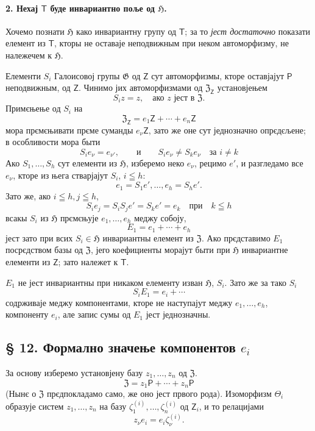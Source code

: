 \documentclass[11pt]{article}
\begin{document}
\paragraph{2. Нехај \(\mathsf T\) буде инвариантно поље од \(\mathfrak H\).}
Хочемо познати \(\mathfrak H\) како инвариантну групу од \(\mathsf T\); за то \emph{јест достаточно} показати елемент из \(\mathsf T\), кторы не оставаје неподвижным при неком автоморфизму, не належечем к \(\mathfrak H\).

Елементи \(S_i\) Галоисовој групы \(\mathfrak G\) од \(\mathsf Z\) сут автоморфизмы, кторе оставјајут \(\mathsf P\) неподвижным, од \(\mathsf Z\). Чинимо јих автоморфизмами од \(\mathfrak Z_{\mathsf Z}\) установјењем
\[
S_i z=z,\quad \text{ако } z \text{ јест в } \mathfrak Z.
\]
Примєњење од \(S_i\) на
\[
\mathfrak Z_{\mathsf Z}=e_1\mathsf Z+\cdots+e_n\mathsf Z
\]
мора прємєњивати прєме суманды \(e_\nu\mathsf Z\), зато же оне сут једнозначно опрєдєљене; в особливости мора быти
\[
S_i e_\nu=e_{\nu'},\qquad\text{и}\qquad S_i e_\nu\ne S_k e_\nu
\quad\text{за } i\ne k
\]
Ако \(S_1,\ldots,S_h\) сут елементи из \(\mathfrak H\), изберемо неко \(e_\nu\), рецимо \(e'\), и разгледамо все \(e_\nu\), кторе из њега стварјајут \(S_i\), \(i\leqq h\):
\[
e_1=S_1e',\ldots,e_h=S_he'.
\]
Зато же, ако \(i\leqq h, j\leqq h\),
\[
S_i e_j=S_iS_j e'=S_ke'=e_k \quad \text{при}\quad k\leqq h
\]
всакы \(S_i\) из \(\mathfrak H\) прємєњује \(e_1,\ldots,e_h\) меджу собоју,
\[
E_1=e_1+\cdots+e_h
\]
јест зато при всих \(S_i\in\mathfrak H\) инвариантны елемент из \(\mathfrak Z\). Ако прєдставимо \(E_1\) посрєдством базы од \(\mathfrak Z\), јего коефициенты морајут быти при \(\mathfrak H\) инвариантне елементи из \(\mathsf Z\); зато належет к \(\mathsf T\).

\(E_1\) не јест инвариантны при никаком елементу изван \(\mathfrak H\), \(S_i\). Зато же за тако \(S_i\)
\[
S_i E_1=e_i+\cdots
\]
содрживаје меджу компонентами, кторе не наступајут меджу \(e_1,\ldots,e_h\), компоненту \(e_i\), але запис сумы од \(E_1\) јест једнозначны.

\subsection*{§ 12. Формално значење компонентов \(e_i\)}\label{die-formale-bedeutung-der-komponenten-ei}

За основу изберемо установјену базу \(z_1,\ldots,z_n\) од \(\mathfrak Z\).
\[
\mathfrak Z=z_1\mathsf P+\cdots+z_n\mathsf P
\]
(Нынє о \(\mathfrak Z\) прєдпокладамо само, же оно јест првого рода). Изоморфизм \(\Theta_i\) образује систем \(z_1,\ldots,z_n\) на базу \(\zeta_1^{(i)},\ldots,\zeta_n^{(i)}\) од \(\mathsf Z_i\), и то релацијами
\[
z_\nu e_i=e_i\zeta_\nu^{(i)} .
\]
\end{document}
